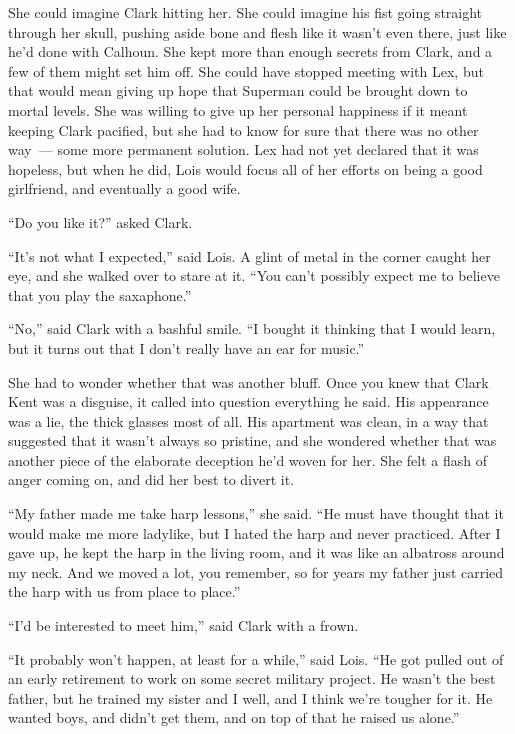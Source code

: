 \documentclass[ebook,12pt]{memoir}
\begin{document}
She could imagine Clark hitting her. She could imagine his fist going
straight through her skull, pushing aside bone and flesh like it wasn't
even there, just like he'd done with Calhoun. She kept more than enough
secrets from Clark, and a few of them might set him off. She could have
stopped meeting with Lex, but that would mean giving up hope that
Superman could be brought down to mortal levels. She was willing to give
up her personal happiness if it meant keeping Clark pacified, but she
had to know for sure that there was no other way~--- some more permanent
solution. Lex had not yet declared that it was hopeless, but when he
did, Lois would focus all of her efforts on being a good girlfriend, and
eventually a good wife.

``Do you like it?'' asked Clark.

``It's not what I expected,'' said Lois. A glint of metal in the corner
caught her eye, and she walked over to stare at it. ``You can't possibly
expect me to believe that you play the saxaphone.''

``No,'' said Clark with a bashful smile. ``I bought it thinking that I
would learn, but it turns out that I don't really have an ear for
music.''

She had to wonder whether that was another bluff. Once you knew that
Clark Kent was a disguise, it called into question everything he said.
His appearance was a lie, the thick glasses most of all. His apartment
was clean, in a way that suggested that it wasn't always so pristine,
and she wondered whether that was another piece of the elaborate
deception he'd woven for her. She felt a flash of anger coming on, and
did her best to divert it.

``My father made me take harp lessons,'' she said. ``He must have
thought that it would make me more ladylike, but I hated the harp and
never practiced. After I gave up, he kept the harp in the living room,
and it was like an albatross around my neck. And we moved a lot, you
remember, so for years my father just carried the harp with us from
place to place.''

``I'd be interested to meet him,'' said Clark with a frown.

``It probably won't happen, at least for a while,'' said Lois. ``He got
pulled out of an early retirement to work on some secret military
project. He wasn't the best father, but he trained my sister and I well,
and I think we're tougher for it. He wanted boys, and didn't get them,
and on top of that he raised us alone.''
\end{document}
